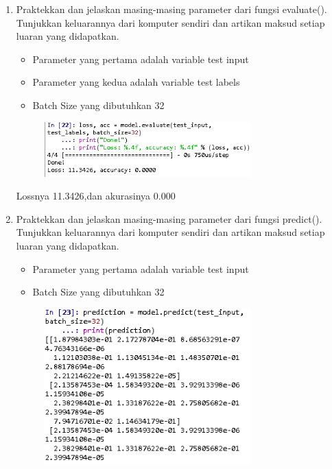 \begin{enumerate}
\begin{figure}[H]
		\centering
	\end{figure}
	\item Praktekkan dan jelaskan masing-masing parameter dari fungsi evaluate(). Tunjukkan keluarannya dari komputer sendiri dan artikan maksud setiap luaran yang didapatkan.
	\hfill\break
	
	\begin{itemize}
		\item Parameter yang pertama adalah variable test input
		\item Parameter yang kedua adalah variable test labels
		\item Batch Size yang dibutuhkan 32
	\end{itemize}
	\hfill\break
	\begin{figure}[H]
		\includegraphics[width=8cm]{figures/1174071/6/10.PNG}
		\centering
	\end{figure}
	Lossnya 11.3426,dan akurasinya 0.000
	\item Praktekkan dan jelaskan masing-masing parameter dari fungsi predict(). Tunjukkan keluarannya dari komputer sendiri dan artikan maksud setiap luaran yang didapatkan.
	\hfill\break
	
	\begin{itemize}
		\item Parameter yang pertama adalah variable test input
		\item Batch Size yang dibutuhkan 32
	\end{itemize}
	\hfill\break
	\begin{figure}[H]
		\includegraphics[width=8cm]{figures/1174071/6/11.PNG}
		\centering
	\end{figure}
\end{enumerate}

